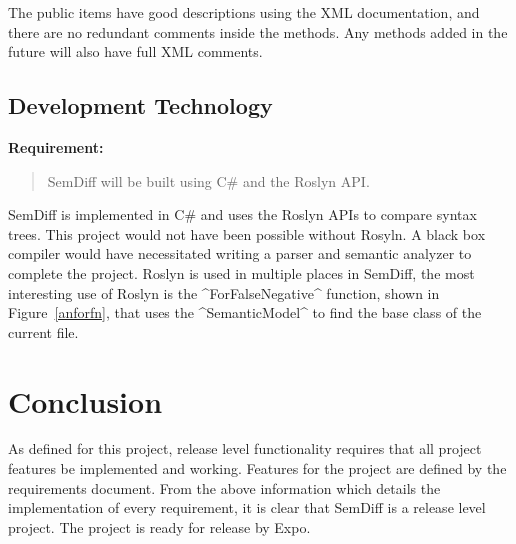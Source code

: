 \documentclass[draftclsnofoot,onecolumn]{IEEEtran}
\begin{document}
The public items have good descriptions using the XML documentation, and there are no redundant comments inside the methods. Any methods added in the future will also have full XML comments.

\newpage

\subsection{Development Technology}%

\textbf{Requirement:}

\begin{quote}

SemDiff will be built using C\# and the Roslyn API.

\end{quote}

SemDiff is implemented in C\# and uses the Roslyn APIs to compare syntax trees. This project would not have been possible without Rosyln. A black box compiler would have necessitated writing a parser and semantic analyzer to complete the project. Roslyn is used in multiple places in SemDiff, the most interesting use of Roslyn is the ^ForFalseNegative^ function, shown in Figure~\ref{anforfn}, that uses the ^SemanticModel^ to find the base class of the current file.

\section{Conclusion}%

As defined for this project, release level functionality requires that all project features be implemented and working. Features for the project are defined by the requirements document. From the above information which details the implementation of every requirement, it is clear that SemDiff is a release level project. The project is ready for release by Expo.

\end{document}
